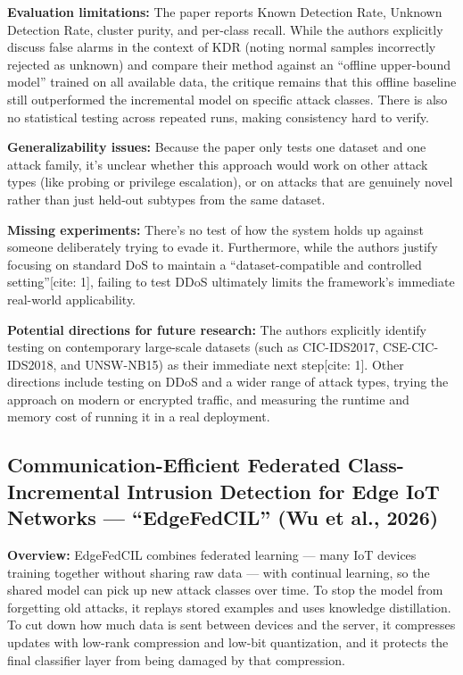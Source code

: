 \documentclass[10pt]{article}
\newcommand{\sumitem}[2]{\noindent\textbf{#1:} #2\par}
\begin{document}
\sumitem{Evaluation limitations}{The paper reports Known Detection Rate, Unknown Detection Rate, cluster purity, and per-class recall. While the authors explicitly discuss false alarms in the context of KDR (noting normal samples incorrectly rejected as unknown) and compare their method against an \enquote{offline upper-bound model} trained on all available data, the critique remains that this offline baseline still outperformed the incremental model on specific attack classes. There is also no statistical testing across repeated runs, making consistency hard to verify.}

\sumitem{Generalizability issues}{Because the paper only tests one dataset and one attack family, it's unclear whether this approach would work on other attack types (like probing or privilege escalation), or on attacks that are genuinely novel rather than just held-out subtypes from the same dataset.}

\sumitem{Missing experiments}{There's no test of how the system holds up against someone deliberately trying to evade it. Furthermore, while the authors justify focusing on standard DoS to maintain a \enquote{dataset-compatible and controlled setting}[cite: 1], failing to test DDoS ultimately limits the framework's immediate real-world applicability.}

\sumitem{Potential directions for future research}{The authors explicitly identify testing on contemporary large-scale datasets (such as CIC-IDS2017, CSE-CIC-IDS2018, and UNSW-NB15) as their immediate next step[cite: 1]. Other directions include testing on DDoS and a wider range of attack types, trying the approach on modern or encrypted traffic, and measuring the runtime and memory cost of running it in a real deployment.}

\clearpage
\subsection{Communication-Efficient Federated Class-Incremental Intrusion Detection for Edge IoT Networks --- \enquote{EdgeFedCIL} (Wu et al., 2026)}

\sumitem{Overview}{EdgeFedCIL combines federated learning --- many IoT devices training together without sharing raw data --- with continual learning, so the shared model can pick up new attack classes over time. To stop the model from forgetting old attacks, it replays stored examples and uses knowledge distillation. To cut down how much data is sent between devices and the server, it compresses updates with low-rank compression and low-bit quantization, and it protects the final classifier layer from being damaged by that compression.}
\end{document}
